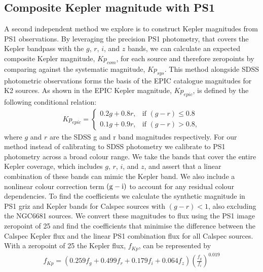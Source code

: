 \documentclass{aastex63}
\newcommand{\rr}[1]{{\bf \color{purple}{#1}}}
\begin{document}
\subsection{Composite Kepler magnitude with PS1} \label{sec:composite}

A second independent method we explore is to construct Kepler magnitudes from PS1 observations. By leveraging the precision PS1 photometry, that covers the Kepler bandpass with the $g$, $r$, $i$, and $z$ bands, we can calculate an expected composite Kepler magnitude, $Kp_{com}$, for each source and therefore zeropoints by comparing against the systematic magnitude, $Kp_{sys}$. This method alongside SDSS photometric observations forms the basis of the EPIC catalogue magnitudes for K2 sources. As shown in \rr{REF} the EPIC Kepler magnitude, $Kp_{epic}$, is defined by the following conditional relation:
\begin{eqnarray}
Kp_{epic} = \begin{cases}
0.2g + 0.8r, & \text{if } (g-r) \leq 0.8\\
0.1g + 0.9r, & \text{if } (g-r) > 0.8,
\end{cases}
\label{eqn:epic}
\end{eqnarray}
where $g$ and $r$ are the SDSS g and r band magnitudes respectively. For our method instead of calibrating to SDSS photometry we calibrate to PS1 photometry across a broad colour range. We take the bands that cover the entire Kepler coverage, which includes $g$, $r$, $i$, and $z$, and assert that a linear combination of these bands can mimic the Kepler band. We also include a nonlinear colour correction term $(\rm g-i)$ to account for any residual colour dependencies. To find the coefficients we calculate the synthetic magnitude in PS1 griz and Kepler bands for Calspec sources with $(g-r) <1$, also excluding the NGC6681 sources. We convert these magnitudes to flux using the PS1 image zeropoint of 25 and find the coefficients that minimise the difference between the Calspec Kepler flux and the linear PS1 combination flux for all Calspec sources. With a zeropoint of 25 the Kepler flux, $f_{Kp}$, can be represented by
\begin{eqnarray}
f_{Kp} = \left(0.259f_g + 0.499f_r + 0.179f_i + 0.064f_z\right) \left(\frac{f_g}{f_i}\right)^{0.019}
\end{eqnarray}
\end{document}

